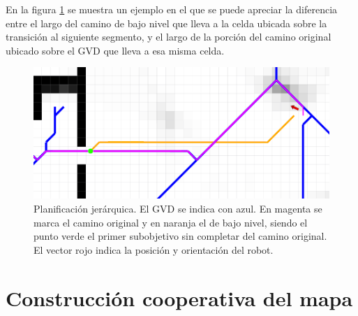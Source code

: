 En la figura \ref{fig:navjer} se muestra un ejemplo en el que se puede apreciar
la diferencia entre el largo del camino de bajo nivel que lleva a la celda
ubicada sobre la transición al siguiente segmento, y el largo de la porción del
camino original ubicado sobre el GVD que lleva a esa misma celda.


\begin{figure}[H]
  \center
  \includegraphics[width=1\linewidth]{imagenes/navjer/caso1/a.png}
  \caption[Planificación jerárquica.]{Planificación jerárquica. El GVD
    se indica con azul. En magenta se marca el camino original y en
    naranja el de bajo nivel, siendo el punto verde el primer
    subobjetivo sin completar del camino original. El vector rojo indica
    la posición y orientación del robot.
 }
  \label{fig:navjer}
\end{figure} 


\section{Construcción cooperativa del mapa}



